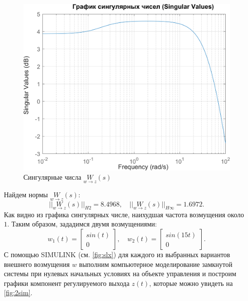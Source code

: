 \begin{figure}[H]
    \centering
    \includegraphics[width=0.8\linewidth]{figs/2_sigma.png}
    \caption{Сингулярные числа $\underset{w\rightarrow z}{W}(s)$}
    \label{fig:2sigma}
\end{figure}
Найдем нормы $\underset{w\rightarrow z}{W}(s)$:
\begin{equation*}
    ||\underset{w\rightarrow z}{W}(s)||_{H2}=8.4968,\quad
    ||\underset{w\rightarrow z}{W}(s)||_{H\infty}=1.6972.
\end{equation*}
Как видно из графика сингулярных числе, наихудшая частота возмущения около $1$. 
Таким образом, зададимся двумя возмущениями:
\begin{equation*}
    w_1(t)=\begin{bmatrix}
        sin(t)\\
        0
    \end{bmatrix},\quad
    w_2(t)=\begin{bmatrix}
        sin(15t)\\
        0
    \end{bmatrix}.
\end{equation*}
С помощью SIMULINK (см. \autoref{fig:slx}) для каждого из выбранных вариантов внешнего возмущения $w$ выполним 
компьютерное моделирование замкнутой системы при нулевых начальных условиях
на объекте управления и построим графики компонент регулируемого выхода
$z(t)$, которые можно увидеть на \autoref{fig:2sim}.
